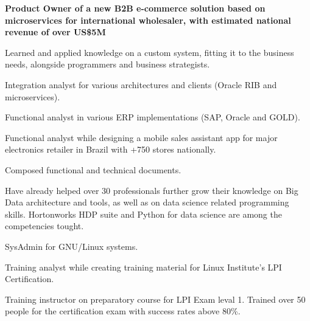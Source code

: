 \documentclass[a4paper]{deedy-resume} %
\begin{document}
\begin{minipage}[t]{0.66\textwidth}
\begin{tightitemize}
\item \bf{Product Owner} of a new B2B e-commerce solution based on microservices for international wholesaler, with estimated national revenue of over US\$5M

Learned and applied knowledge on a custom system, fitting it to the business needs, alongside programmers and business strategists.
\item Integration analyst for various architectures and clients (Oracle RIB and microservices).
\item Functional analyst in various ERP implementations (SAP, Oracle and GOLD).
\item Functional analyst while designing a mobile sales assistant app for major electronics retailer in Brazil with +750 stores nationally.
\item Composed functional and technical documents.
\end{tightitemize}

\sectionspace %

Have already helped over 30 professionals further grow their knowledge on Big Data architecture and tools, as well as on data science related programming skills. Hortonworks HDP suite and Python for data science are among the competencies tought.

\sectionspace %


\begin{tightitemize}
\item SysAdmin for GNU/Linux systems.
\item Training analyst while creating training material for  Linux Institute's LPI Certification.
\item Training instructor on preparatory course for LPI Exam leval 1. Trained over 50 people for the certification exam with success rates above 80\%.
\end{tightitemize}

\sectionspace %



\end{minipage}
\end{document}
